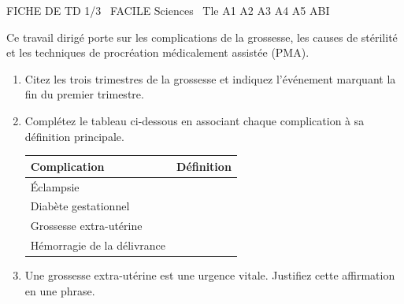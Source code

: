 \documentclass[11pt]{article}
\begin{document}
\begin{tcolorbox}[enhanced,colback=popink,colframe=popink,arc=10pt,boxrule=0pt,left=12pt,right=12pt,top=9pt,bottom=9pt]
{\color{white}\popxbold\small FICHE DE TD 1/3 \textbullet\ FACILE \hfill Sciences \textbullet\ Tle A1 A2 A3 A4 A5 ABI\par}
\end{tcolorbox}
\vspace{4pt}
Ce travail dirigé porte sur les complications de la grossesse, les causes de stérilité et les techniques de procréation médicalement assistée (PMA).

\begin{exercice}
\begin{enumerate}
    \item Citez les trois trimestres de la grossesse et indiquez l'événement marquant la fin du premier trimestre.
    \item Complétez le tableau ci-dessous en associant chaque complication à sa définition principale.
    
    \begin{tabular}{|p{3.5cm}|p{10cm}|}
    \hline
    \textbf{Complication} & \textbf{Définition} \\ \hline
    Éclampsie &  \\ \hline
    Diabète gestationnel &  \\ \hline
    Grossesse extra-utérine &  \\ \hline
    Hémorragie de la délivrance &  \\ \hline
    \end{tabular}
    
    \item Une grossesse extra-utérine est une urgence vitale. Justifiez cette affirmation en une phrase.
\end{enumerate}
\end{exercice}
\end{document}
